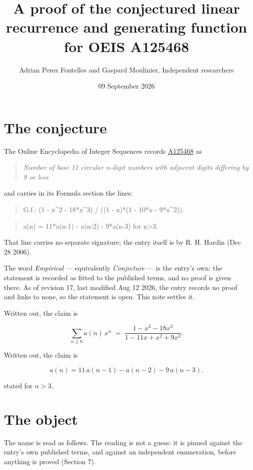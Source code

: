 \documentclass[11pt]{article}
\title{A proof of the conjectured linear recurrence and generating function for OEIS A125468}
\author{Adrian Perez Fontelles and Gaspard Moulinier, Independent researchers}
\date{09 September 2026}
\theoremstyle{definition}
\begin{document}
\maketitle
\section{The conjecture}

The Online Encyclopedia of Integer Sequences records \href{https://oeis.org/A125468}{A125468} as

\begin{quote}\itshape Number of base 11 circular n-digit numbers with adjacent digits differing by 9 or less\end{quote}

and carries in its Formula section the lines:

\begin{quote}\ttfamily G.f.: (1 - x\textasciicircum{}2 - 18*x\textasciicircum{}3) / ((1 - x)*(1 - 10*x - 9*x\textasciicircum{}2)).\end{quote}

\begin{quote}\ttfamily a(n) = 11*a(n-1) - a(n-2) - 9*a(n-3) for n>3.\end{quote}

That line carries no separate signature; the entry itself is by R. H. Hardin (Dec 28 2006).

The word {\itshape Empirical} --- equivalently {\itshape Conjecture} --- is the entry's own: the statement is recorded as fitted to the published terms, and no proof is given there. As of revision 17, last modified Aug 12 2026, the entry records no proof and links to none, so the statement is open. This note settles it.

Written out, the claim is

\[\sum_{n \ge 0} a(n)\,x^n \;=\; \frac{1 - x^{2} - 18x^{3}}{1 - 11x + x^{2} + 9x^{3}}.\]

Written out, the claim is

\[a(n) = 11\,a(n-1) - a(n-2) - 9\,a(n-3).\]

stated for $n > 3$.

\section{The object}

The name is read as follows. The reading is not a guess: it is pinned against the entry's own published terms, and against an independent enumeration, before anything is proved (Section 7).
\end{document}
